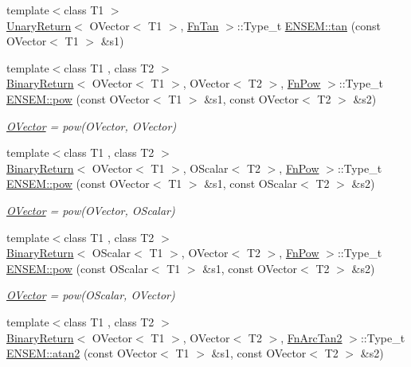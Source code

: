 \begin{DoxyCompactItemize}
\item 
{\footnotesize template$<$class T1 $>$ }\\\mbox{\hyperlink{structUnaryReturn}{Unary\+Return}}$<$ O\+Vector$<$ T1 $>$, \mbox{\hyperlink{structFnTan}{Fn\+Tan}} $>$\+::Type\+\_\+t \mbox{\hyperlink{group__obsvector_gaf380b1c371f0b85fa8b4f4e207fa15de}{E\+N\+S\+E\+M\+::tan}} (const O\+Vector$<$ T1 $>$ \&s1)
\item 
{\footnotesize template$<$class T1 , class T2 $>$ }\\\mbox{\hyperlink{structBinaryReturn}{Binary\+Return}}$<$ O\+Vector$<$ T1 $>$, O\+Vector$<$ T2 $>$, \mbox{\hyperlink{structFnPow}{Fn\+Pow}} $>$\+::Type\+\_\+t \mbox{\hyperlink{group__obsvector_ga48ab93692ad432295c8498d12a368861}{E\+N\+S\+E\+M\+::pow}} (const O\+Vector$<$ T1 $>$ \&s1, const O\+Vector$<$ T2 $>$ \&s2)
\begin{DoxyCompactList}\small\item\em \mbox{\hyperlink{classENSEM_1_1OVector}{O\+Vector}} = pow(\+O\+Vector, O\+Vector) \end{DoxyCompactList}\item 
{\footnotesize template$<$class T1 , class T2 $>$ }\\\mbox{\hyperlink{structBinaryReturn}{Binary\+Return}}$<$ O\+Vector$<$ T1 $>$, O\+Scalar$<$ T2 $>$, \mbox{\hyperlink{structFnPow}{Fn\+Pow}} $>$\+::Type\+\_\+t \mbox{\hyperlink{group__obsvector_gacd9051c476ef11d6697002aa2b6ecd7c}{E\+N\+S\+E\+M\+::pow}} (const O\+Vector$<$ T1 $>$ \&s1, const O\+Scalar$<$ T2 $>$ \&s2)
\begin{DoxyCompactList}\small\item\em \mbox{\hyperlink{classENSEM_1_1OVector}{O\+Vector}} = pow(\+O\+Vector, O\+Scalar) \end{DoxyCompactList}\item 
{\footnotesize template$<$class T1 , class T2 $>$ }\\\mbox{\hyperlink{structBinaryReturn}{Binary\+Return}}$<$ O\+Scalar$<$ T1 $>$, O\+Vector$<$ T2 $>$, \mbox{\hyperlink{structFnPow}{Fn\+Pow}} $>$\+::Type\+\_\+t \mbox{\hyperlink{group__obsvector_ga3466dc3452f93c110d8adba91bf1e85a}{E\+N\+S\+E\+M\+::pow}} (const O\+Scalar$<$ T1 $>$ \&s1, const O\+Vector$<$ T2 $>$ \&s2)
\begin{DoxyCompactList}\small\item\em \mbox{\hyperlink{classENSEM_1_1OVector}{O\+Vector}} = pow(\+O\+Scalar, O\+Vector) \end{DoxyCompactList}\item 
{\footnotesize template$<$class T1 , class T2 $>$ }\\\mbox{\hyperlink{structBinaryReturn}{Binary\+Return}}$<$ O\+Vector$<$ T1 $>$, O\+Vector$<$ T2 $>$, \mbox{\hyperlink{structFnArcTan2}{Fn\+Arc\+Tan2}} $>$\+::Type\+\_\+t \mbox{\hyperlink{group__obsvector_gae0d11c0b7d0fc49cc1e2765f21d10a2b}{E\+N\+S\+E\+M\+::atan2}} (const O\+Vector$<$ T1 $>$ \&s1, const O\+Vector$<$ T2 $>$ \&s2)

\end{DoxyCompactItemize}
